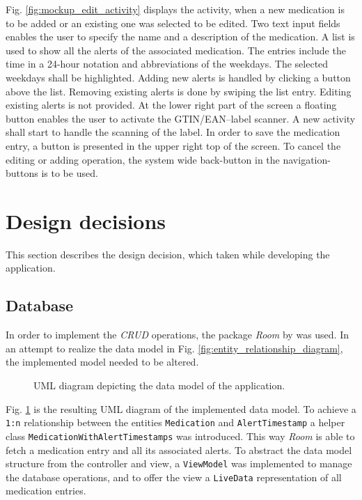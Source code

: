 \documentclass[conference]{IEEEtran}
\begin{document}
Fig. \ref{fig:mockup_edit_activity} displays the activity, when a new medication is to be added or an existing
one was selected to be edited. Two text input fields enables the user to specify the name and a description of 
the medication. A list is used to show all the alerts of the associated medication. The entries include the time
in a 24-hour notation and abbreviations of the weekdays. The selected weekdays shall be highlighted. Adding new 
alerts is handled by clicking a button above the list. Removing existing alerts is done by swiping the list entry.
Editing existing alerts is not provided. At the lower right part of the screen a floating button enables the user
to activate the GTIN/EAN--label scanner. A new activity shall start to handle the scanning of the label.
In order to save the medication entry, a button is presented in the upper right top of the screen. To cancel the
editing or adding operation, the system wide back-button in the navigation-buttons is to be used.

\section{Design decisions}

This section describes the design decision, which taken while developing the application.

\subsection{Database}

In order to implement the \textit{CRUD} operations, the package \textit{Room} by \cite{room} was used.
In an attempt to realize the data model in Fig. \ref{fig:entity_relationship_diagram}, the implemented model
needed to be altered.

\begin{figure}[H]
	\centerline{}
	\caption{UML diagram depicting the data model of the application.}
	\label{fig:uml_diagram}
\end{figure}

Fig. \ref{fig:uml_diagram} is the resulting UML diagram of the implemented data model. To achieve a \texttt{1:n}
relationship between the entities \texttt{Medication} and \texttt{AlertTimestamp} a helper class
\texttt{MedicationWithAlertTimestamps} was introduced. This way \textit{Room} is able to fetch a medication entry
and all its associated alerts. To abstract the data model structure from the controller and view, a
\texttt{ViewModel} was implemented to manage the database operations, and to offer the view a \texttt{LiveData}
representation of all medication entries.
\end{document}

